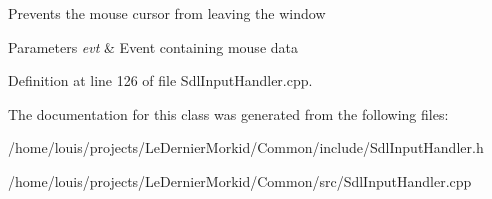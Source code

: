 Prevents the mouse cursor from leaving the window 
\begin{DoxyParams}{Parameters}
{\em evt} & Event containing mouse data \\
\hline
\end{DoxyParams}


Definition at line 126 of file Sdl\+Input\+Handler.\+cpp.



The documentation for this class was generated from the following files\+:\begin{DoxyCompactItemize}
\item 
/home/louis/projects/\+Le\+Dernier\+Morkid/\+Common/include/Sdl\+Input\+Handler.\+h\item 
/home/louis/projects/\+Le\+Dernier\+Morkid/\+Common/src/Sdl\+Input\+Handler.\+cpp\end{DoxyCompactItemize}
